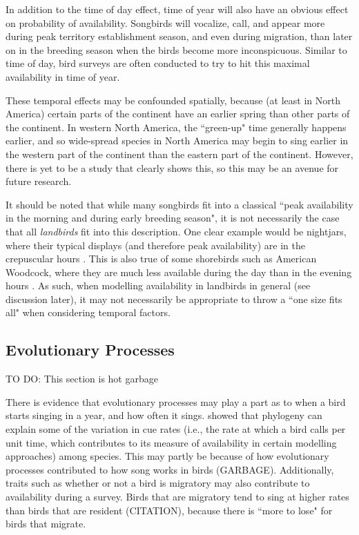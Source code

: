 \par In addition to the time of day effect, time of year will also have an obvious effect on probability of availability.
Songbirds will vocalize, call, and appear more during peak territory establishment season, and even during migration,  than later on in the breeding season when the birds become more inconspicuous.
Similar to time of day, bird surveys are often conducted to try to hit this maximal availability in time of year.

\par These temporal effects may be confounded spatially, because (at least in North America) certain parts of the continent have an earlier spring than other parts of the continent.
In western North America, the ``green-up" time generally happens earlier, and so wide-spread species in North America may begin to sing earlier in the western part of the continent than the eastern part of the continent.
However, there is yet to be a study that clearly shows this, so this may be an avenue for future research.

\par It should be noted that while many songbirds fit into a classical ``peak availability in the morning and during early breeding season", it is not necessarily the case that all \textit{landbirds} fit into this description.
One clear example would be nightjars, where their typical displays (and therefore peak availability) are in the crepuscular hours \citep{knight_still_2022}.
This is also true of some shorebirds such as American Woodcock, where they are much less available during the day than in the evening hours \citep{binley_better_2023}.
As such, when modelling availability in landbirds in general (see discussion later), it may not necessarily be appropriate to throw a ``one size fits all" when considering temporal factors.

\subsection{Evolutionary Processes}
TO DO: This section is hot garbage
\par There is evidence that evolutionary processes may play a part as to when a bird starts singing in a year, and how often it sings. 
\citet{solymos_phylogeny_2018} showed that phylogeny can explain some of the variation in cue rates (i.e., the rate at which a bird calls per unit time, which contributes to its measure of availability in certain modelling approaches) among species. 
This may partly be because of how evolutionary processes contributed to how song works in birds (GARBAGE).
Additionally, traits such as whether or not a bird is migratory may also contribute to availability during a survey.
Birds that are migratory tend to sing at higher rates than birds that are resident (CITATION), because there is ``more to lose" for birds that migrate.

